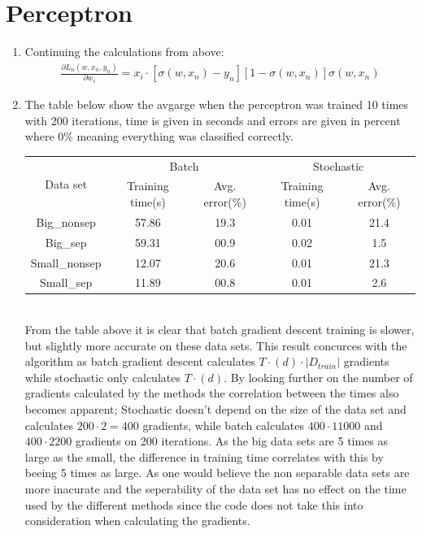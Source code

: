 \documentclass{article}
\newcommand{\abs}[1]{\lvert #1 \rvert}
\begin{document}
\section{Perceptron}
\begin{enumerate}
\item Continuing the calculations from above:
  \begin{align*}
    \frac{\partial L_n(w,x_n,y_n)}{\partial w_i} =
    x_i \cdot \left[ \sigma(w,x_n) - y_n \right] \left[ 1 - \sigma(w,x_n) \right] \sigma(w,x_n)
  \end{align*}

\item The table below show the avgarge when the perceptron was trained 10 times
  with 200 iterations, time is given in seconds and errors are given in percent
  where 0\% meaning everything was classified correctly. \\
  \begin{tabular}{|c|c|c|c|c|}
    \hline
    \multirow{2}{*}{Data set} & \multicolumn{2}{|c|}{Batch} &  \multicolumn{2}{|c|}{Stochastic} \\
    \cline{2-5}
    & Training time(s) & Avg. error(\%) & Training time(s) & Avg. error(\%) \\
    \hline
    Big\_nonsep   & 57.86 & 19.3 & 0.01 & 21.4 \\
    \hline
    Big\_sep      & 59.31 & 00.9 & 0.02 & 1.5 \\
    \hline
    Small\_nonsep & 12.07 & 20.6 & 0.01 & 21.3 \\
    \hline
    Small\_sep    & 11.89 & 00.8 & 0.01 & 2.6 \\
    \hline
  \end{tabular} \\
  From the table above it is clear that batch gradient descent training is
  slower, but slightly more accurate on these data sets. This result concurces
  with the algorithm as batch gradient descent calculates $T \cdot (d) \cdot
  \abs{D_{train}}$ gradients while stochastic only calculates $T \cdot (d)$.
  By looking further on the number of gradients calculated by the methods the
  correlation between the times also becomes apparent; Stochastic doesn't depend
  on the size of the data set and calculates $200 \cdot 2 = 400$ gradients,
  while batch calculates $400 \cdot 11000$ and $400 \cdot 2200$ gradients on 200
  iterations. As the big data sets are 5 times as large as the small, the
  difference in training time correlates with this by beeing 5 times as large.
  As one would believe the non separable data sets are more inacurate and the
  seperability of the data set has no effect on the time used by the different
  methods since the code does not take this into consideration when calculating
  the gradients.


\end{enumerate}
\end{document}
